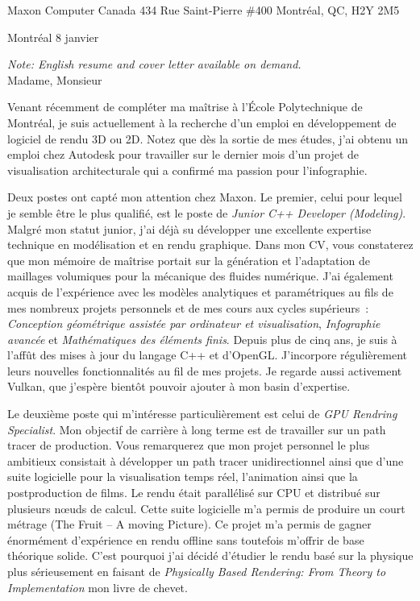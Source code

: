 \insertcvheader
\clurecipient
 {Maxon Computer Canada}
 {434 Rue Saint-Pierre \#400}
 {Montréal, QC, H2Y 2M5}
 
\cllocationdate
 {Montréal}
 {8 janvier}
 
\textit{Note: English resume and cover letter available on demand.}\\
 
\clgreeting
 {Madame, Monsieur}
 
Venant récemment de compléter ma maîtrise à l’École Polytechnique de Montréal, je suis actuellement à la recherche d’un emploi en développement de logiciel de rendu 3D ou 2D. Notez que dès la sortie de mes études, j'ai obtenu un emploi chez Autodesk pour travailler sur le dernier mois d'un projet de visualisation architecturale qui a confirmé ma passion pour l'infographie.

Deux postes ont capté mon attention chez Maxon. Le premier, celui pour lequel je semble être le plus qualifié, est le poste de \textit{Junior C++ Developer (Modeling)}. Malgré mon statut junior, j'ai déjà su développer une excellente expertise technique en modélisation et en rendu graphique. Dans mon CV, vous constaterez que mon mémoire de maîtrise portait sur la génération et l'adaptation de maillages volumiques pour la mécanique des fluides numérique. J'ai également acquis de l'expérience avec les modèles analytiques et paramétriques au fils de mes nombreux projets personnels et de mes cours aux cycles supérieurs~: \textit{Conception géométrique assistée par ordinateur et visualisation}, \textit{Infographie avancée} et \textit{Mathématiques des éléments finis}. Depuis plus de cinq ans, je suis à l'affût des mises à jour du langage C++ et d'OpenGL. J'incorpore régulièrement leurs nouvelles fonctionnalités au fil de mes projets. Je regarde aussi activement Vulkan, que j'espère bientôt pouvoir ajouter à mon basin d'expertise. 

Le deuxième poste qui m'intéresse particulièrement est celui de \textit{GPU Rendring Specialist}. Mon objectif de carrière à long terme est de travailler sur un path tracer de production. Vous remarquerez que mon projet personnel le plus ambitieux consistait à développer un path tracer unidirectionnel ainsi que d'une suite logicielle pour la visualisation temps réel, l'animation ainsi que la postproduction de films. Le rendu était parallélisé sur CPU et distribué sur plusieurs nœuds de calcul. Cette suite logicielle m'a permis de produire un court métrage (The Fruit -- A moving Picture). Ce projet m'a permis de gagner énormément d'expérience en rendu offline sans toutefois m'offrir de base théorique solide. C'est pourquoi j'ai décidé d'étudier le rendu basé sur la physique plus sérieusement en faisant de \textit{Physically Based Rendering: From Theory to Implementation} mon livre de chevet.

